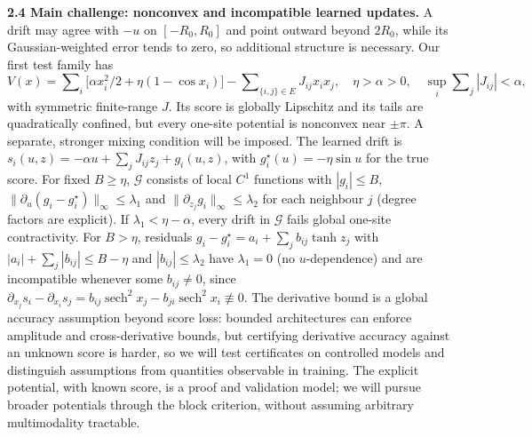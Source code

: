 \documentclass[12pt,a4paper]{article}
\begin{document}
\textbf{2.4 Main challenge: nonconvex and incompatible learned updates.}
A drift may agree with $-u$ on $[-R_0,R_0]$ and point outward beyond $2R_0$, while its Gaussian-weighted error tends to zero, so additional structure is necessary. Our first test family has
\begin{equation}\label{eq:potential}
 V(x)=\sum\nolimits_i\bigl[\alpha x_i^2/2+\eta(1-\cos x_i)\bigr]
 -\sum\nolimits_{\{i,j\}\in E}J_{ij}x_ix_j,
 \quad \eta>\alpha>0,\quad\sup_i\sum\nolimits_j|J_{ij}|<\alpha,
\end{equation}
with symmetric finite-range $J$. Its score is globally Lipschitz and its tails are quadratically confined, but every one-site potential is nonconvex near $\pm\pi$. A separate, stronger mixing condition will be imposed. The learned drift is $s_i(u,z)=-\alpha u+\sum_jJ_{ij}z_j+g_i(u,z)$, with $g_i^\star(u)=-\eta\sin u$ for the true score. For fixed $B\geq\eta$, $\mathcal G$ consists of local $C^1$ functions with $|g_i|\leq B$, $\|\partial_u(g_i-g_i^\star)\|_\infty\leq\lambda_1$ and $\|\partial_{z_j}g_i\|_\infty\leq\lambda_2$ for each neighbour $j$ (degree factors are explicit). If $\lambda_1<\eta-\alpha$, every drift in $\mathcal G$ fails global one-site contractivity. For $B>\eta$, residuals $g_i-g_i^\star=a_i+\sum_j b_{ij}\tanh z_j$ with $|a_i|+\sum_j|b_{ij}|\leq B-\eta$ and $|b_{ij}|\leq\lambda_2$ have $\lambda_1=0$ (no $u$-dependence) and are incompatible whenever some $b_{ij}\neq0$, since $\partial_{x_j}s_i-\partial_{x_i}s_j=b_{ij}\operatorname{sech}^2x_j-b_{ji}\operatorname{sech}^2x_i\not\equiv0$.
The derivative bound is a global accuracy assumption beyond score loss: bounded architectures can enforce amplitude and cross-derivative bounds, but certifying derivative accuracy against an unknown score is harder, so we will test certificates on controlled models and distinguish assumptions from quantities observable in training. The explicit potential, with known score, is a proof and validation model; we will pursue broader potentials through the block criterion, without assuming arbitrary multimodality tractable.
\end{document}
